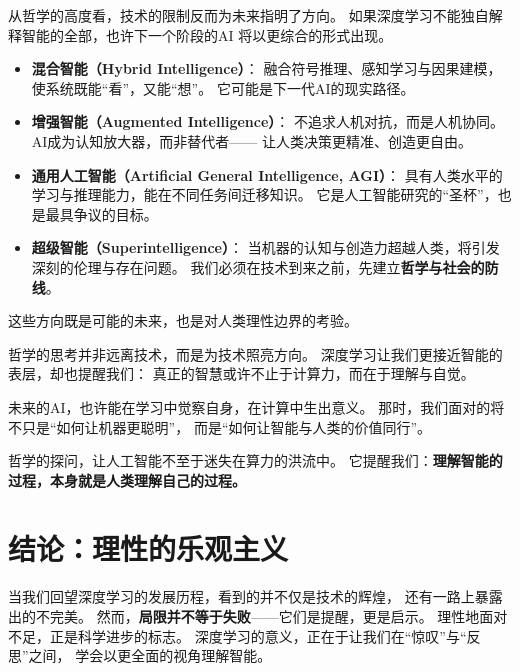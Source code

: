 从哲学的高度看，技术的限制反而为未来指明了方向。  
如果深度学习不能独自解释智能的全部，也许下一个阶段的AI  
将以更综合的形式出现。

\begin{itemize}
\item \textbf{混合智能（Hybrid Intelligence）}：  
  融合符号推理、感知学习与因果建模，使系统既能“看”，又能“想”。  
  它可能是下一代AI的现实路径。  

\item \textbf{增强智能（Augmented Intelligence）}：  
  不追求人机对抗，而是人机协同。  
  AI成为认知放大器，而非替代者——  
  让人类决策更精准、创造更自由。  

\item \textbf{通用人工智能（Artificial General Intelligence, AGI）}：  
  具有人类水平的学习与推理能力，能在不同任务间迁移知识。  
  它是人工智能研究的“圣杯”，也是最具争议的目标。  

\item \textbf{超级智能（Superintelligence）}：  
  当机器的认知与创造力超越人类，将引发深刻的伦理与存在问题。  
  我们必须在技术到来之前，先建立\textbf{哲学与社会的防线}。  
\end{itemize}
这些方向既是可能的未来，也是对人类理性边界的考验。

哲学的思考并非远离技术，而是为技术照亮方向。  
深度学习让我们更接近智能的表层，却也提醒我们：  
真正的智慧或许不止于计算力，而在于理解与自觉。  

未来的AI，也许能在学习中觉察自身，在计算中生出意义。  
那时，我们面对的将不只是“如何让机器更聪明”，  
而是“如何让智能与人类的价值同行”。  

哲学的探问，让人工智能不至于迷失在算力的洪流中。  
它提醒我们：\textbf{理解智能的过程，本身就是人类理解自己的过程。}

\section{结论：理性的乐观主义}

当我们回望深度学习的发展历程，看到的并不仅是技术的辉煌，  
还有一路上暴露出的不完美。  
然而，\textbf{局限并不等于失败}——它们是提醒，更是启示。  
理性地面对不足，正是科学进步的标志。  
深度学习的意义，正在于让我们在“惊叹”与“反思”之间，  
学会以更全面的视角理解智能。

